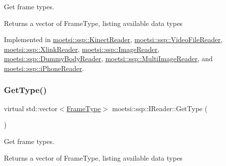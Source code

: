Get frame types. 

\begin{DoxyReturn}{Returns}
a vector of Frame\+Type, listing available data types 
\end{DoxyReturn}


Implemented in \hyperlink{classmoetsi_1_1ssp_1_1KinectReader_aef896aa686cbe1ea82dfc6aad46b6ff7}{moetsi\+::ssp\+::\+Kinect\+Reader}, \hyperlink{classmoetsi_1_1ssp_1_1VideoFileReader_a9d47af47299c5fccf766ac2d848a561b}{moetsi\+::ssp\+::\+Video\+File\+Reader}, \hyperlink{classmoetsi_1_1ssp_1_1XlinkReader_a2119c9bc9e4929ff37115a7be463eb92}{moetsi\+::ssp\+::\+Xlink\+Reader}, \hyperlink{classmoetsi_1_1ssp_1_1ImageReader_af6f66957b6e3268c5336f4176c77fc73}{moetsi\+::ssp\+::\+Image\+Reader}, \hyperlink{classmoetsi_1_1ssp_1_1DummyBodyReader_a2219d7fd14ca1448fb4c6f2541ac3c9b}{moetsi\+::ssp\+::\+Dummy\+Body\+Reader}, \hyperlink{classmoetsi_1_1ssp_1_1MultiImageReader_ad5f6cf0cfb1e64bcf569ab0bbfcce9d6}{moetsi\+::ssp\+::\+Multi\+Image\+Reader}, and \hyperlink{classmoetsi_1_1ssp_1_1iPhoneReader_a05d285ace85fc570bc2f453a0862ae56}{moetsi\+::ssp\+::i\+Phone\+Reader}.

\mbox{\label{classmoetsi_1_1ssp_1_1IReader_a4116c1931fde7bd66133934ffdca1cce}} 
\subsubsection{\texorpdfstring{Get\+Type()}{GetType()}\hspace{0.1cm}{\footnotesize\ttfamily [2/2]}}
{\footnotesize\ttfamily virtual std\+::vector$<$\hyperlink{namespacemoetsi_1_1ssp_a46efdfa2cd5a28ead465dcc8006b5a87}{Frame\+Type}$>$ moetsi\+::ssp\+::\+I\+Reader\+::\+Get\+Type (\begin{DoxyParamCaption}{ }\end{DoxyParamCaption})\hspace{0.3cm}{\ttfamily [pure virtual]}}



Get frame types. 

\begin{DoxyReturn}{Returns}
a vector of Frame\+Type, listing available data types 
\end{DoxyReturn}


